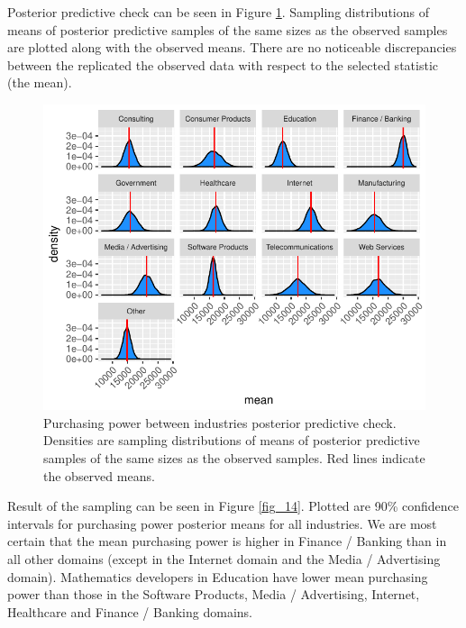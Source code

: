 \documentclass{article}
\begin{document}
Posterior predictive check can be seen in Figure \ref{fig_13}. Sampling distributions of means of posterior predictive samples of the same sizes as the observed samples are plotted along with the observed means. There are no noticeable discrepancies between the replicated the observed data with respect to the selected statistic (the mean).




\begin{figure}[H]
\centering
\includegraphics{report-044}
\caption{Purchasing power between industries posterior predictive check. Densities are sampling distributions of means of posterior predictive samples of the same sizes as the observed samples. Red lines indicate the observed means.}\label{fig_13}
\end{figure}

Result of the sampling can be seen in Figure \ref{fig_14}. Plotted are 90\% confidence intervals for purchasing power posterior means for all industries. We are most certain that the mean purchasing power is higher in Finance / Banking than in all other domains (except in the Internet domain and the Media / Advertising domain). Mathematics developers in Education have lower mean purchasing power than those in the Software Products, Media / Advertising, Internet, Healthcare and Finance / Banking domains.
\end{document}

